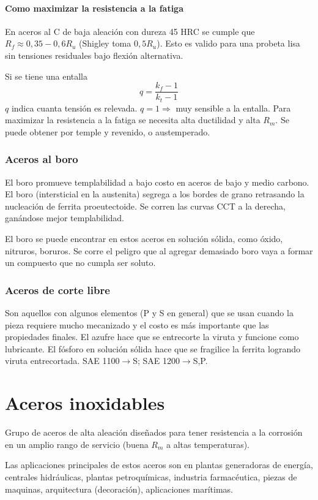 \documentclass{article}
\begin{document}
\subsection*{Como maximizar la resistencia a la fatiga}
En aceros al C de baja aleación con dureza 45 HRC se cumple que $R_f \approx 0,35 - 0,6R_u$ (Shigley toma $0,5R_u$). Esto es valido para una probeta lisa sin tensiones residuales bajo flexión alternativa.

Si se tiene una entalla
\[
q = \frac{k_f -1}{k_t - 1}
\]
$q$ indica cuanta tensión es relevada. $q=1 \Rightarrow$ muy sensible a la entalla.  Para maximizar la resistencia a la fatiga se necesita alta ductilidad y alta $R_m$. Se puede obtener por temple y revenido, o austemperado.

\section{Aceros al boro}
El boro promueve templabilidad a bajo costo en aceros de bajo y medio carbono. El boro (intersticial en la austenita) segrega a los bordes de grano retrasando la nucleación de ferrita proeutectoide. Se corren las curvas CCT a la derecha, ganándose mejor templabilidad.

El boro se puede encontrar en estos aceros en solución sólida, como óxido, nitruros, boruros. Se corre el peligro que al agregar demasiado boro vaya a formar un compuesto que no cumpla ser soluto.

\section{Aceros de corte libre}

Son aquellos con algunos elementos (P y S en general) que se usan cuando la pieza requiere mucho mecanizado y el costo es más importante que las propiedades finales. El azufre hace que se entrecorte la viruta y funcione como lubricante.  El fósforo en solución sólida hace que se fragilice la ferrita logrando viruta entrecortada. SAE 1100$\rightarrow$S; SAE 1200$\rightarrow$S,P.

\part{Aceros inoxidables}
Grupo de aceros de alta aleación diseñados para tener resistencia a la corrosión en un amplio rango de servicio (buena $R_m$ a altas temperaturas).

Las aplicaciones principales de estos aceros son en plantas generadoras de energía, centrales hidráulicas, plantas petroquímicas, industria farmacéutica, piezas de maquinas, arquitectura (decoración), aplicaciones marítimas.
\end{document}
